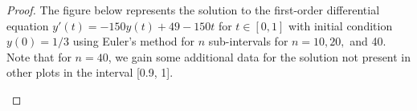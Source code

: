 \documentclass[12pt]{article}
\theoremstyle{definition}
\begin{document}
\begin{proof}
  The figure below represents the solution to the first-order differential equation
  $y'(t) = -150 y(t) + 49 - 150 t$ for $t \in [0, 1]$ with initial condition $y(0) = 1/3$
  using Euler's method for $n$ sub-intervals for $n=10,20,$ and 40. Note that for $n=40$, we gain some additional data for the solution not present in other
  plots in the interval [0.9, 1].
  \begin{center}
  \end{center}
\end{proof}
\end{document}
